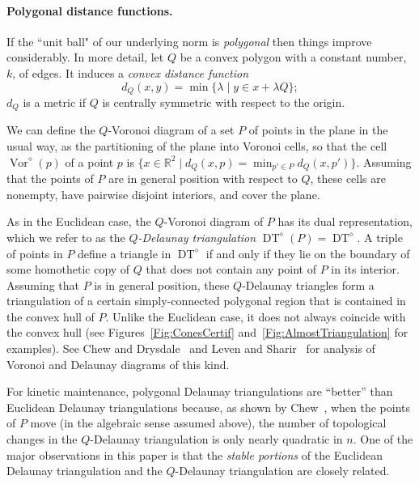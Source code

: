 \documentclass[letter,11pt]{article}
\def \reals{{\mathbb R}}
\def\poly{\diamond}
\def\DT{\mathop{\mathrm{DT}}}
\def\Vor{\mathop{\mathrm{Vor}}}
\begin{document}
\paragraph{Polygonal distance functions.} 
If the ``unit ball" of our
underlying norm is {\em polygonal} then things improve considerably.
In more detail, let $Q$ be a convex polygon with a constant
number, $k$, of edges.  It induces a {\em convex distance function}
$$d_Q(x,y) = \min\{\lambda \mid y\in x+\lambda Q\};$$ 
$d_Q$ is a metric if $Q$ is centrally symmetric with respect to the origin.

We can define the $Q$-Voronoi diagram
of a set $P$ of points in the plane in the usual way, as the
partitioning of the plane into Voronoi cells, so that the cell
$\Vor^\poly(p)$ of a point $p$ is
$\{ x\in\reals^2 \mid d_Q(x,p)=\min_{p'\in P}d_Q(x,p') \}$.
Assuming that the points of $P$ are in general position with respect
to $Q$, these cells are nonempty, have pairwise disjoint interiors,
and cover the plane. 

As in the Euclidean case, the $Q$-Voronoi diagram of $P$ has its 
dual representation, which we refer to as the {\em $Q$-Delaunay
triangulation} $\DT^\poly(P)=\DT^\poly$. A triple of points in $P$ define a
triangle in $\DT^\poly$ if and only if they lie on the boundary of some 
homothetic copy of $Q$ that does not contain any point of $P$ in its
interior. Assuming that $P$ is in general position, these $Q$-Delaunay
triangles form a triangulation of a certain simply-connected polygonal 
region that is contained in the convex hull of $P$.
Unlike the Euclidean case, it does not always coincide with the convex hull (see Figures~\ref{Fig:ConesCertif} and~\ref{Fig:AlmostTriangulation} for examples).
See Chew and Drysdale~\cite{CD} and Leven and Sharir~\cite{LS} for analysis of Voronoi and Delaunay diagrams of this kind.

For kinetic maintenance, polygonal Delaunay triangulations are
``better'' than Euclidean Delaunay triangulations because, as shown by
Chew~\cite{Chew}, when the points of $P$ move (in the algebraic
sense assumed above), the number of topological changes in the 
$Q$-Delaunay triangulation is only nearly quadratic in $n$.
One of
the major observations in this paper is that the \textit{stable portions} of the Euclidean Delaunay triangulation and the $Q$-Delaunay triangulation are closely related.
\end{document}
